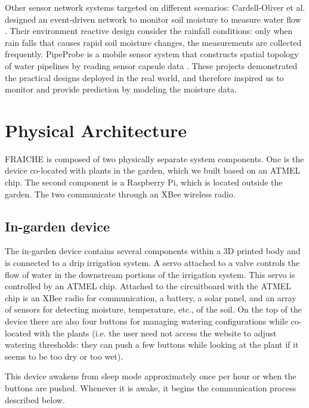 \documentclass[a4paper]{acm_proc_article-sp}
\makeatletter
\newcommand{\ie}{i.e.\@\xspace}
\newcommand{\etc}{etc.\@\xspace}
\makeatother
\begin{document}
Other sensor network systems targeted on different scenarios: Cardell-Oliver et al. designed an event-driven network to monitor soil moisture to measure water flow \cite{CardellOliver:2004wg}. Their environment reactive design consider the rainfall conditions: only when rain falls that causes rapid soil moisture changes, the measurements are collected frequently. PipeProbe is a mobile sensor system that constructs spatial topology of water pipelines by reading sensor capsule data \cite{Lai:2010gn}. These projects demonstrated the practical designs deployed in the real world, and therefore inspired us to monitor and provide prediction by modeling the moisture data.


\section{Physical Architecture}

FRAICHE is composed of two physically separate system components.  One is the device co-located with plants in the garden, which we built based on an ATMEL chip.  The second component is a Raspberry Pi, which is located outside the garden.  The two communicate through an XBee wireless radio.

\subsection{In-garden device}

The in-garden device contains several components within a 3D printed body and is connected to a drip irrigation system.  A servo attached to a valve controls the flow of water in the downstream portions of the irrigation system.  This servo is controlled by an ATMEL chip.  Attached to the circuitboard with the ATMEL chip is an XBee radio for communication, a battery, a solar panel, and an array of sensors for detecting moisture, temperature, \etc, of the soil.  On the top of the device there are also four buttons for managing watering configurations while co-located with the plants (\ie the user need not access the website to adjust watering thresholds: they can push a few buttons while looking at the plant if it seems to be too dry or too wet).

This device awakens from sleep mode approximately once per hour or when the buttons are pushed.  Whenever it is awake, it begins the communication process described below.
\end{document}
